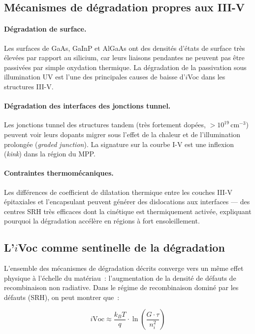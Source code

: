 \documentclass[12pt,a4paper]{report}
\begin{document}
\subsection{Mécanismes de dégradation propres aux III-V}

\paragraph{Dégradation de surface.}
Les surfaces de GaAs, GaInP et AlGaAs ont des densités d'états de surface très élevées par rapport au silicium, car leurs liaisons pendantes ne peuvent pas être passivées par simple oxydation thermique. La dégradation de la passivation sous illumination UV est l'une des principales causes de baisse d'$i$Voc dans les structures III-V.

\paragraph{Dégradation des interfaces des jonctions tunnel.}
Les jonctions tunnel des structures tandem (très fortement dopées, $> 10^{19}\,\text{cm}^{-3}$) peuvent voir leurs dopants migrer sous l'effet de la chaleur et de l'illumination prolongée (\textit{graded junction}). La signature sur la courbe I-V est une inflexion (\textit{kink}) dans la région du MPP.

\paragraph{Contraintes thermomécaniques.}
Les différences de coefficient de dilatation thermique entre les couches III-V épitaxiales et l'encapsulant peuvent générer des dislocations aux interfaces --- des centres SRH très efficaces dont la cinétique est thermiquement activée, expliquant pourquoi la dégradation accélère en régions à fort ensoleillement.

\subsection{L'$i$Voc comme sentinelle de la dégradation}

L'ensemble des mécanismes de dégradation décrits converge vers un même effet physique à l'échelle du matériau~: l'augmentation de la densité de défauts de recombinaison non radiative. Dans le régime de recombinaison dominé par les défauts (SRH), on peut montrer que~:

\begin{equation}
i\text{Voc} \approx \frac{k_BT}{q} \cdot \ln\!\left(\frac{G \cdot \tau}{n_i^2}\right)
\end{equation}
\end{document}
